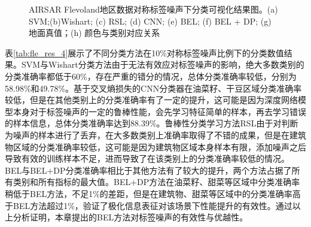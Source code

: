 \begin{figure}[ht]

  \caption{AIRSAR Flevoland地区数据对称标签噪声下分类可视化结果图。(a) SVM;(b)Wishart; (c) RSL; (d) CNN; (e) BEL; (f) BEL + DP; (g) 地面真值；(h) 颜色与类别对应关系}
  \label{fig:fle_res_4}
\end{figure}

表\ref{tab:fle_res_4}展示了不同分类方法在10\%对称标签噪声比例下的分类数值结果。SVM与Wishart分类方法由于无法有效应对标签噪声的影响，绝大多数类别的分类准确率都低于60\%，存在严重的错分的情况，总体分类准确率较低，分别为58.98\%和49.78\%。基于交叉熵损失的CNN分类器在油菜籽、干豆区域分类准确率较低，但是在其他类别上的分类准确率有了一定的提升，这可能是因为深度网络模型本身对于标签噪声的一定的鲁棒性能，会先学习特征简单的样本，再去学习错误的样本信息，总体分类准确率达到88.39\%。鲁棒性分类学习方法RSL由于对判断为噪声的样本进行了丢弃，在大多数类别上准确率取得了不错的成果，但是在建筑物区域的分类准确率较低，这可能是因为建筑物区域本身样本有限，添加噪声之后导致有效的训练样本不足，进而导致了在该类别上的分类准确率较低的情况。BEL与BEL+DP分类准确率相比于其他方法有了较大的提升，两个方法占据了所有类别和所有指标的最大值。BEL+DP方法在油菜籽、甜菜等区域中分类准确率稍低于BEL方法，不足1\%的差距，但是在建筑物、甜菜等区域中的分类准确率高于BEL方法超过1\%，验证了极化信息表征对该场景下性能提升的有效性。通过以上分析证明，本章提出的BEL方法对标签噪声的有效性与优越性。

